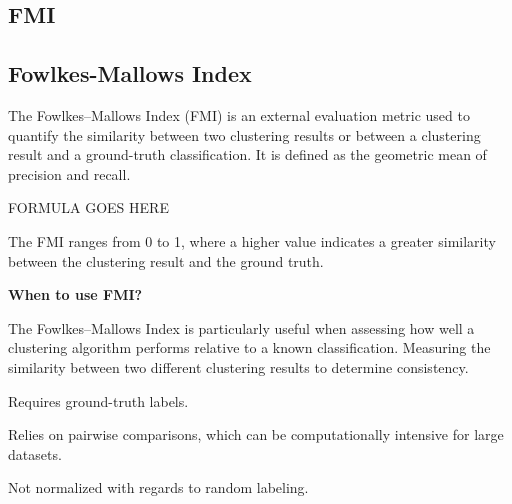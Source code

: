 \begin{center}
\clearpage
\thispagestyle{clusteringstyle}
\section{FMI}
\subsection{Fowlkes-Mallows Index}

The Fowlkes–Mallows Index (FMI) is an external evaluation metric used to quantify the similarity between two clustering results
or between a clustering result and a ground-truth classification. It is defined as the geometric mean of precision and recall.

\begin{center}
    FORMULA GOES HERE

\end{center}

The FMI ranges from 0 to 1, where a higher value indicates a greater similarity between the clustering result and the ground
truth.

\textbf{When to use FMI?}

The Fowlkes–Mallows Index is particularly useful when assessing how well a clustering algorithm performs relative to a
known classification. Measuring the similarity between two different clustering results to determine consistency.

{
    \item Requires ground-truth labels.
    \item Relies on pairwise comparisons, which can be computationally intensive for large datasets.
    \item Not normalized with regards to random labeling.
}



\end{center}
